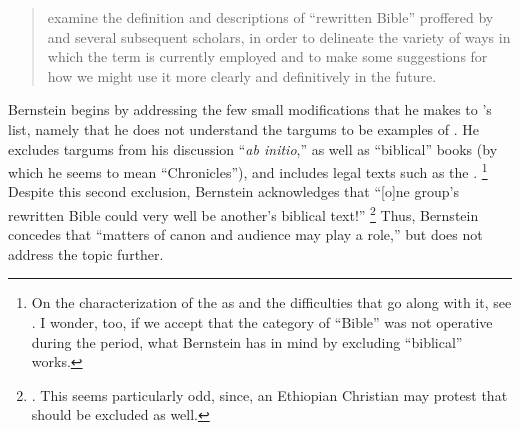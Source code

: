 \begin{quote}
    examine the definition and descriptions of ``rewritten Bible'' proffered by \vermes and several subsequent scholars, in order to delineate the variety of ways in which the term is currently employed and to make some suggestions for how we might use it more clearly and definitively in the future.%
    \autocite[171--172]{bernstein_textus2005}
\end{quote}

Bernstein begins by addressing the few small modifications that he makes to \vermes's list, namely that he does not understand the targums to be examples of \rwb. He excludes targums from his discussion ``\emph{ab initio},'' as well as ``biblical'' books (by which he seems to mean ``Chronicles''), and includes legal texts such as the \templescroll.%
    \footnote{%
        On the characterization of the \templescroll as \rwb and the difficulties that go along with it, see 
        \cite{fraade_goldstein-etal2017}. 
        I wonder, too, if we accept that the category of ``Bible'' was not operative during the \secondtemple period, what Bernstein has in mind by excluding ``biblical'' works.}
Despite this second exclusion, Bernstein acknowledges that ``[o]ne group's rewritten Bible could very well be another's biblical text!''%
    \footnote{%
        \Cite[175]{bernstein_textus2005}.
        This seems particularly odd, since, an Ethiopian Christian may protest that \jub should be excluded as well.}
Thus, Bernstein concedes that ``matters of canon and audience may play a role,'' but does not address the topic further. 

